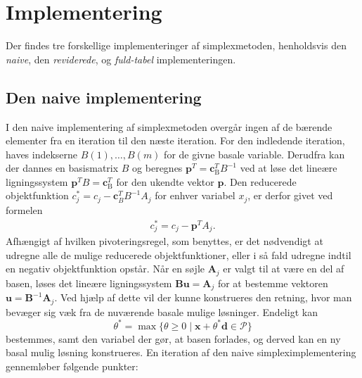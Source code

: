 %
\section{Implementering}
\label{julieergudesmuk}
Der findes tre forskellige implementeringer af simplexmetoden, henholdsvis den \textit{naive}, den \textit{reviderede}, og \textit{fuld-tabel} implementeringen.
%
\subsection{Den naive implementering}
I den naive implementering af simplexmetoden overgår ingen af de bærende elementer fra en iteration til den næste iteration. 
For den indledende iteration, haves indekserne
$B(1),\ldots,B(m)$ for de givne basale variable. 
Derudfra kan der dannes en basismatrix $B$ og beregnes $\mathbf{p}^T=\mathbf{c}_{\text{B}}^T B^{-1}$ ved at løse det lineære ligningssystem $\mathbf{p}^T B=\mathbf{c}_{\text{B}}^T$ for den ukendte vektor $\mathbf{p}$.
Den reducerede objektfunktion $c_j^* = c_j - \mathbf{c}_B^T B^{-1}A_j$ for enhver variabel $x_j$, er derfor givet ved formelen
%
\begin{align*}
c_j^* = c_j - \mathbf{p}^T A_j.
\end{align*}
%
Afhængigt af hvilken pivoteringsregel, som benyttes, er det nødvendigt at udregne alle de mulige reducerede objektfunktioner, eller i så fald udregne indtil en negativ objektfunktion opstår.
Når en søjle $\mathbf{A}_j$ er valgt til at være en del af basen, løses det lineære ligningssystem $\mathbf{Bu}=\mathbf{A}_j$ for at bestemme vektoren $\mathbf{u}=\mathbf{B}^{-1}\mathbf{A}_j$.
Ved hjælp af dette vil der kunne konstrueres den retning, hvor man bevæger sig væk fra de nuværende basale mulige løsninger.
Endeligt kan $$\theta^* = \max \{ \theta \geq 0 \mid \textbf{x} + \theta^*\textbf{d} \in \mathcal{P} \}$$ bestemmes, samt den variabel der gør, at basen forlades, og derved kan en ny basal mulig løsning konstrueres. 
En iteration af den naive simpleximplementering gennemløber følgende punkter: 
%
